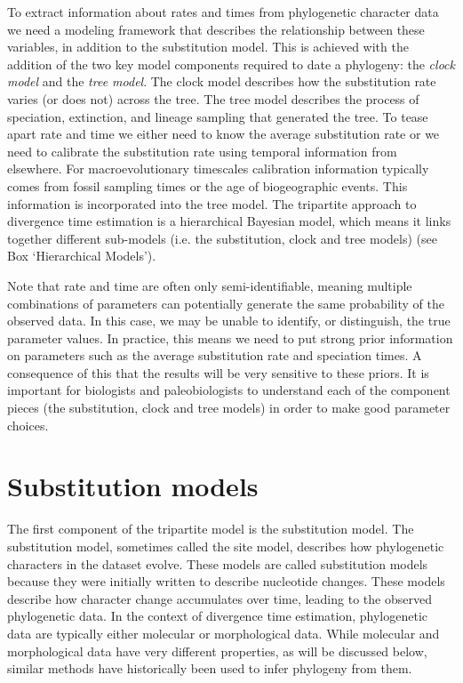To extract information about rates and times from phylogenetic character data we need a modeling framework that describes the  relationship between these variables, in addition to the substitution model.
This is achieved with the addition of the two key model components required to date a phylogeny: the \textit{clock model} and the \textit{tree model}.
The clock model describes how the substitution rate varies (or does not) across the tree.
The tree model describes the process of speciation, extinction, and lineage sampling that generated the tree.
To tease apart rate and time we either need to know the average substitution rate or we need to calibrate the substitution rate using temporal information from elsewhere.
For macroevolutionary timescales calibration information typically comes from fossil sampling times or the age of biogeographic events. This information is incorporated into the tree model.
The tripartite approach to divergence time estimation is a hierarchical Bayesian model, which means it links together different sub-models (i.e. the substitution, clock and tree models) (see Box `Hierarchical Models').

Note that rate and time are often only semi-identifiable, meaning multiple combinations of parameters can potentially generate the same probability of the observed data.
In this case, we may be unable to identify, or distinguish, the true parameter values.
In practice, this means we need to put strong prior information on parameters such as the average substitution rate and speciation times. 
A consequence of this that the results will be very sensitive to these priors.
It is important for biologists and paleobiologists to understand each of the component pieces (the substitution, clock and tree models) in order to make good parameter choices.

\section{Substitution models}

The first component of the tripartite model is the substitution model.
The substitution model, sometimes called the site model, describes how phylogenetic characters in the dataset evolve.
These models are called substitution models because they were initially written to describe nucleotide changes.
These models describe how character change accumulates over time, leading to the observed phylogenetic data.
In the context of divergence time estimation, phylogenetic data are typically either molecular or morphological data. 
While molecular and morphological data have very different properties, as will be discussed below, similar methods have historically been used to infer phylogeny from them.

